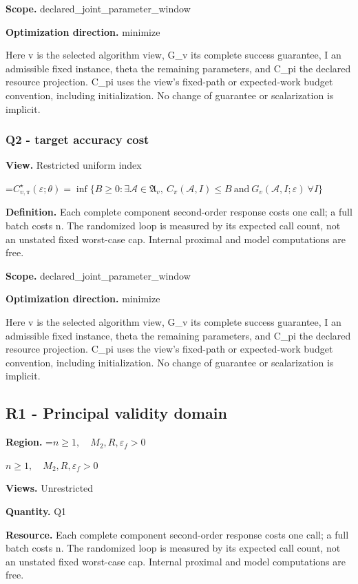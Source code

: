 \documentclass[10pt,a4paper]{article}
\newcommand{\AtlasMath}[1]{\par\begingroup\centering\setbox0=\hbox{$\displaystyle #1$}\ifdim\wd0>1.4\linewidth\typeout{ATLAS WIDE FORMULA: \the\wd0}\fi\ifdim\wd0>\linewidth\resizebox{\linewidth}{!}{\box0}\else\box0\fi\par\endgroup}
\newcommand{\AtlasInlineMath}[1]{\begingroup\setbox0=\hbox{$#1$}\ifdim\wd0>.4\linewidth\endgroup\AtlasMath{#1}\else\endgroup$#1$\fi}
\begin{document}
\textbf{Scope.} declared\_joint\_parameter\_window

\textbf{Optimization direction.} minimize

Here v is the selected algorithm view, G\_v its complete success guarantee, I an admissible fixed instance, theta the remaining parameters, and C\_pi the declared resource projection. C\_pi uses the view's fixed-path or expected-work budget convention, including initialization. No change of guarantee or scalarization is implicit.

\subsubsection{Q2 - target accuracy cost}
\textbf{View.} Restricted uniform index

\AtlasMath{C^\star_{v,\pi}(\varepsilon;\theta)=\inf\{B\ge0:\exists\mathcal A\in\mathfrak A_v,\ C_\pi(\mathcal A,I)\le B\ \text{and}\ G_v(\mathcal A,I;\varepsilon)\ \forall I\}}
\textbf{Definition.} Each complete component second-order response costs one call; a full batch costs n. The randomized loop is measured by its expected call count, not an unstated fixed worst-case cap. Internal proximal and model computations are free.

\textbf{Scope.} declared\_joint\_parameter\_window

\textbf{Optimization direction.} minimize

Here v is the selected algorithm view, G\_v its complete success guarantee, I an admissible fixed instance, theta the remaining parameters, and C\_pi the declared resource projection. C\_pi uses the view's fixed-path or expected-work budget convention, including initialization. No change of guarantee or scalarization is implicit.

\subsection{R1 - Principal validity domain}
\textbf{Region.} \AtlasInlineMath{n\ge1,\quad M_2,R,\varepsilon_f>0}

\textbf{Views.} Unrestricted

\textbf{Quantity.} Q1

\textbf{Resource.} Each complete component second-order response costs one call; a full batch costs n. The randomized loop is measured by its expected call count, not an unstated fixed worst-case cap. Internal proximal and model computations are free.
\end{document}
